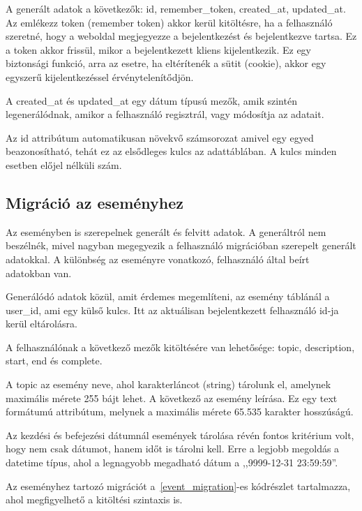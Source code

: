 \documentclass[
]{thesis-ekf}
\theoremstyle{definition}
\theoremstyle{remark}
\begin{document}
	A generált adatok a következők: id, remember\_token, created\_at, updated\_at. Az emlékezz token (remember token) akkor kerül kitöltésre, ha a felhasználó szeretné, hogy a weboldal megjegyezze a bejelentkezést és bejelentkezve tartsa. Ez a token akkor frissül, mikor a bejelentkezett kliens kijelentkezik. Ez egy biztonsági funkció, arra az esetre, ha eltérítenék a sütit (cookie), akkor egy egyszerű kijelentkezéssel érvénytelenítődjön. 
	
	A created\_at és updated\_at egy dátum típusú mezők, amik szintén legenerálódnak, amikor a felhasználó regisztrál, vagy módosítja az adatait. 
	
	Az id attribútum automatikusan növekvő számsorozat amivel egy egyed beazonosítható, tehát ez az elsődleges kulcs az adattáblában.  A kulcs minden esetben előjel nélküli szám.
	
	\subsection{Migráció az eseményhez}
	Az eseményben is szerepelnek generált és felvitt adatok. A generáltról nem beszélnék, mivel nagyban megegyezik a felhasználó migrációban szerepelt generált adatokkal. A különbség az eseményre vonatkozó, felhasználó által beírt adatokban van. 
	
	Generálódó adatok közül, amit érdemes megemlíteni, az esemény táblánál a user\_id, ami egy külső kulcs. Itt az aktuálisan bejelentkezett felhasználó id-ja kerül eltárolásra. 
	
	A felhasználónak a következő mezők kitöltésére van lehetősége: topic, description, start, end és complete. 
	
	A topic az esemény neve, ahol karakterláncot (string) tárolunk el, amelynek maximális mérete 255 bájt lehet. A következő az esemény leírása. Ez egy text formátumú attribútum, melynek a maximális mérete 65.535 karakter hosszúságú.
	
	Az kezdési és befejezési dátumnál események tárolása révén fontos kritérium volt, hogy nem csak dátumot, hanem időt is tárolni kell. Erre a legjobb megoldás a datetime típus, ahol a legnagyobb megadható dátum a ,,9999-12-31 23:59:59''.
	
	Az eseményhez tartozó migrációt a~\ref{event_migration}-es kódrészlet tartalmazza, ahol megfigyelhető a kitöltési szintaxis is. 
	
	
	
\end{document}
